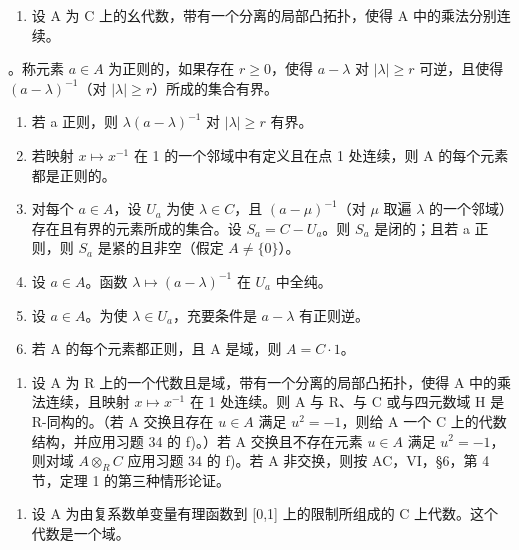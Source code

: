 \begin{enumerate}
\def\labelenumi{\arabic{enumi})}
\setcounter{enumi}{33}
\tightlist
\item
  设 A 为 C 上的幺代数，带有一个分离的局部凸拓扑，使得 A 中的乘法分别连续。
\end{enumerate}

。称元素 \(a \in A\) 为正则的，如果存在 \(r \geqslant 0\)，使得 \(a - \lambda\) 对 \(|\lambda| \geqslant r\) 可逆，且使得 \((a - \lambda)^{-1}\)（对 \(|\lambda| \geqslant r\)）所成的集合有界。

\begin{enumerate}
\def\labelenumi{\alph{enumi})}
\item
  若 a 正则，则 \(\lambda(a-\lambda)^{-1}\) 对 \(|\lambda|\geqslant r\) 有界。
\item
  若映射 \(x \mapsto x^{-1}\) 在 1 的一个邻域中有定义且在点 1 处连续，则 A 的每个元素都是正则的。
\item
  对每个 \(a \in A\)，设 \(U_{a}\) 为使 \(\lambda \in C\)，且 \((a - \mu)^{-1}\)（对 \(\mu\) 取遍 \(\lambda\) 的一个邻域）存在且有界的元素所成的集合。设 \(S_{a} = C - U_{a}\)。则 \(S_{a}\) 是闭的；且若 a 正则，则 \(S_{a}\) 是紧的且非空（假定 \(A \neq \{0\}\)）。
\item
  设 \(a \in A\)。函数 \(\lambda \mapsto (a - \lambda)^{-1}\) 在 \(U_{a}\) 中全纯。
\item
  设 \(a \in A\)。为使 \(\lambda \in U_{a}\)，充要条件是 \(a - \lambda\) 有正则逆。
\item
  若 A 的每个元素都正则，且 A 是域，则 \(A = C \cdot 1\)。
\end{enumerate}

\begin{enumerate}
\def\labelenumi{\arabic{enumi})}
\setcounter{enumi}{34}
\tightlist
\item
  设 A 为 R 上的一个代数且是域，带有一个分离的局部凸拓扑，使得 A 中的乘法连续，且映射 \(x \mapsto x^{-1}\) 在 1 处连续。则 A 与 R、与 C 或与四元数域 H 是 R-同构的。（若 A 交换且存在 \(u \in A\) 满足 \(u^{2} = -1\)，则给 A 一个 C 上的代数结构，并应用习题 34 的 f)。）若 A 交换且不存在元素 \(u \in A\) 满足 \(u^{2} = -1\)，则对域 \(A \otimes_{R} C\) 应用习题 34 的 f)。若 A 非交换，则按 AC，VI，§6，第 4 节，定理 1 的第三种情形论证。
\end{enumerate}

\begin{enumerate}
\def\labelenumi{¶ \arabic{enumi})}
\setcounter{enumi}{35}
\tightlist
\item
  设 A 为由复系数单变量有理函数到 {[}0,1{]} 上的限制所组成的 C 上代数。这个代数是一个域。
\end{enumerate}

